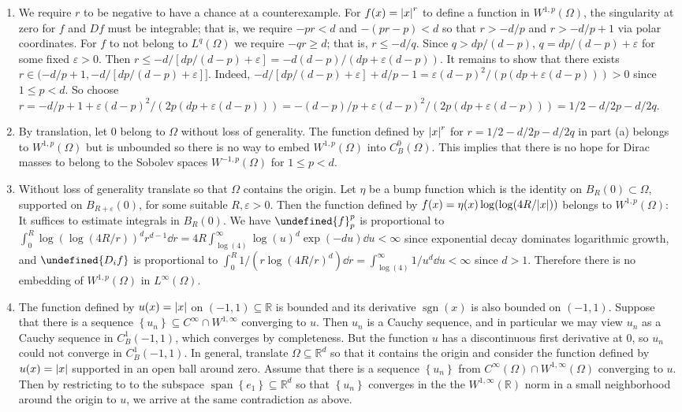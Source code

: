 \documentclass[11pt,leqno]{article}
\theoremstyle{plain}
\theoremstyle{definition}
\numberwithin{equation}{section}
\numberwithin{lem}{section}
\newcommand{\cbr}[1]{\left\{#1\right\}}
\DeclareMathOperator{\Span}{span}
\DeclareMathOperator{\sgn}{sgn}
\let\norm\undefined %
\DeclarePairedDelimiter\norm{\lVert}{\rVert}
\begin{document}
\begin{enumerate}
\begin{enumerate}
      \item We require $r$ to be negative to have a chance at a counterexample. For $f(x) = \abs{x}^{r}$ to define a function in $W^{1,p}(\Omega)$, the singularity at zero for $f$ and $Df$ must be integrable; that is, we require $-pr<d$ and $-(pr-p)<d$ so that $r>-d/p$ and $r>-d/p+1$ via polar coordinates. For $f$ to not belong to $L^q(\Omega)$ we require $-qr\geq d$; that is, $r\leq -d/q$. Since $q > dp/(d-p)$, $q = dp/(d-p) + \varepsilon$ for some fixed $\varepsilon>0$. Then $r\leq -d/[dp/(d-p) + \varepsilon]= -d(d-p)/(dp+\varepsilon(d-p))$. It remains to show that there exists $r\in (-d/p+1, -d/[dp/(d-p) + \varepsilon]]$. Indeed, $-d/[dp/(d-p) + \varepsilon] + d/p-1 = \varepsilon(d-p)^2/(p(dp+\varepsilon(d-p)))>0$ since $1\leq p< d$. So choose $r = -d/p+1 + \varepsilon(d-p)^2/(2p(dp+\varepsilon(d-p))) = -(d-p)/p + \varepsilon(d-p)^2/(2p(dp+\varepsilon(d-p))) = 1/2-d/2p-d/2q$.
      \item By translation, let $0$ belong to $\Omega$ without loss of generality. The function defined by $\abs{x}^r$ for $r = 1/2-d/2p-d/2q$ in part (a) belongs to $W^{1,p}(\Omega)$ but is unbounded so there is no way to embed $W^{1,p}(\Omega)$ into $C^0_B(\Omega)$. This implies that there is no hope for Dirac masses to belong to the Sobolev spaces $W^{-1,p}(\Omega)$ for $1\leq p < d$. 
      \item Without loss of generality translate so that $\Omega$ contains the origin. Let $\eta$ be a bump function which is the identity on $B_R(0)\subset \Omega$, supported on $B_{R+\varepsilon}(0)$, for some suitable $R,\varepsilon>0$. Then the function defined by $f(x) = \eta(x)\log(\log(4R/\abs{x}))$ belongs to $W^{1,p}(\Omega)$: It suffices to estimate integrals in $B_R(0)$. We have $\norm{f}_p^p$ is proportional to $\int_0^R \log(\log(4R/r))^d r^{d-1}\dd r = 4R\int_{\log(4)}^\infty \log(u)^d\exp(-du)\dd u < \infty$ since exponential decay dominates logarithmic growth, and $\norm{D_if}$ is proportional to $\int_0^R1/(r\log(4R/r)^d)\dd r = \int_{\log(4)}^\infty1/u^d\dd u <\infty$ since $d>1$. Therefore there is no embedding of $W^{1,p}(\Omega)$ in $L^\infty(\Omega)$.
      \item The function defined by $u(x) = \abs{x}$ on $(-1,1)\subseteq \mathbb R$ is bounded and its derivative $\sgn(x)$ is also bounded on $(-1,1)$. Suppose that there is a sequence $\cbr{u_n}\subseteq C^\infty\cap W^{1,\infty}$ converging to $u$. Then $u_n$ is a Cauchy sequence, and in particular we may view $u_n$ as a Cauchy sequence in $C^1_B(-1,1)$, which converges by completeness. But the function $u$ has a discontinuous first derivative at $0$, so $u_n$ could not converge in $C^1_B(-1,1)$. In general, translate $\Omega\subseteq \mathbb R^d$ so that it contains the origin and consider the function defined by $u(x) = \abs{x}$ supported in an open ball around zero. Assume that there is a sequence $\cbr{u_n}$ from $C^{\infty}(\Omega)\cap W^{1,\infty}(\Omega)$ converging to $u$. Then by restricting to to the subspace $\Span\cbr{e_1}\subseteq \mathbb R^d$ so that $\cbr{u_n}$ converges in the the $W^{1,\infty}(\mathbb R)$ norm in a small neighborhood around the origin to $u$, we arrive at the same contradiction as above.

\end{enumerate}
\end{enumerate}
\end{document}
